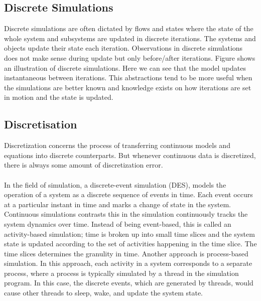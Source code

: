 \subsection{Discrete Simulations}
Discrete simulations are often dictated by flows and states where the state of the whole system and subsystems are updated in discrete iterations. The systems and objects update their state each iteration. Observations in discrete simulations does not make sense during update but only before/after iterations. Figure  shows an illustration of discrete simulations. Here we can see that the model updates instantaneous between iterations. This abstractions tend to be more useful when the simulations are better known and knowledge exists on how iterations are set in motion and the state is updated.


\subsection{Discretisation}\label{dis}

Discretization concerns the process of transferring continuous models and equations into discrete counterparts. But whenever continuous data is discretized, there is always some amount of discretization error.
\\\\ %
In the field of simulation, a discrete-event simulation (DES), models the operation of a system as a discrete sequence of events in time. Each event occurs at a particular instant in time and marks a change of state in the system.
Continuous simulations contrasts this in the simulation continuously tracks the system dynamics over time. Instead of being event-based, this is called an activity-based simulation; time is broken up into small time slices and the system state is updated according to the set of activities happening in the time slice. The time slices determines the granulity in time.
Another approach is process-based simulation. In this approach, each activity in a system corresponds to a separate process, where a process is typically simulated by a thread in the simulation program. In this case, the discrete events, which are generated by threads, would cause other threads to sleep, wake, and update the system state.



